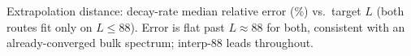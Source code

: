 \begin{table}[t]
\centering
\caption{Extrapolation distance: decay-rate median relative error (\%) vs.\ target
$L$ (both routes fit only on $L\le88$). Error is flat past $L\approx88$ for both,
consistent with an already-converged bulk spectrum; interp-88 leads throughout.}
\label{tab:ladder}
\small

\end{table}
